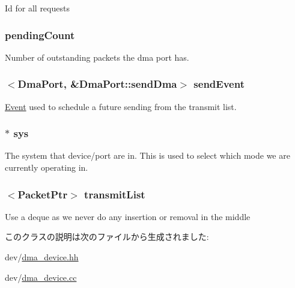 Id for all requests \hypertarget{classDmaPort_a42162a6fc29d8d8b33c43a0d19b60058}{
\subsubsection[{pendingCount}]{ {\bf pendingCount}}}
\label{classDmaPort_a42162a6fc29d8d8b33c43a0d19b60058}
Number of outstanding packets the dma port has. \hypertarget{classDmaPort_a944ed919343d4c184161d71c8b113c98}{
\subsubsection[{sendEvent}]{$<${\bf DmaPort}, \&DmaPort::sendDma$>$ {\bf sendEvent}}}
\label{classDmaPort_a944ed919343d4c184161d71c8b113c98}
\hyperlink{classEvent}{Event} used to schedule a future sending from the transmit list. \hypertarget{classDmaPort_a8ae37465ba84acfef6af3e9b9e6dbbd5}{
\subsubsection[{sys}]{$\ast$ {\bf sys}}}
\label{classDmaPort_a8ae37465ba84acfef6af3e9b9e6dbbd5}
The system that device/port are in. This is used to select which mode we are currently operating in. \hypertarget{classDmaPort_aa1daf4e9dc0076207688f30abccdaab5}{
\subsubsection[{transmitList}]{$<${\bf PacketPtr}$>$ {\bf transmitList}}}
\label{classDmaPort_aa1daf4e9dc0076207688f30abccdaab5}
Use a deque as we never do any insertion or removal in the middle 

このクラスの説明は次のファイルから生成されました:\begin{DoxyCompactItemize}
\item 
dev/\hyperlink{dma__device_8hh}{dma\_\-device.hh}\item 
dev/\hyperlink{dma__device_8cc}{dma\_\-device.cc}\end{DoxyCompactItemize}
